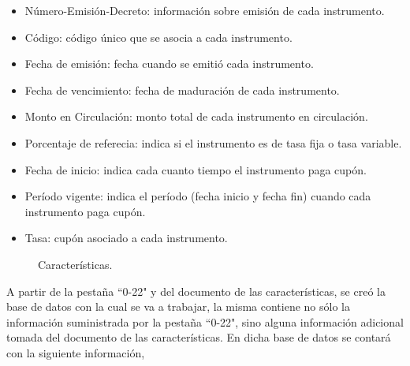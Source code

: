 \begin{itemize}
  \item N\'umero-Emisi\'on-Decreto: informaci\'on sobre emisi\'on de cada instrumento.
  \item C\'odigo: c\'odigo \'unico que se asocia a cada instrumento.
  \item Fecha de emisi\'on: fecha cuando se emiti\'o cada instrumento.
  \item Fecha de vencimiento: fecha de maduraci\'on de cada instrumento.
  \item Monto en Circulaci\'on: monto total de cada instrumento en circulaci\'on.
  \item Porcentaje de referecia: indica si el instrumento es de tasa fija o tasa variable.
  \item Fecha de inicio: indica cada cuanto tiempo el instrumento paga cup\'on.
  \item Per\'iodo vigente: indica el per\'iodo (fecha inicio y fecha fin) cuando cada instrumento paga cup\'on.
  \item Tasa: cup\'on asociado a cada instrumento.
\end{itemize}



\begin{figure}[h]
\caption{Caracter\'isticas.}
\label{doc_carac}
\end{figure}


\hspace{0.4cm} A partir de la pesta\~na ``0-22"\hspace{0.01cm} y del documento de las caracter\'isticas, se cre\'o la base de datos con la cual se va a trabajar, la misma contiene no s\'olo la informaci\'on suministrada por la pesta\~na ``0-22", sino alguna informaci\'on adicional tomada del documento de las caracter\'isticas. En dicha base de datos se contar\'a con la siguiente informaci\'on,

\vspace{0.5cm}

